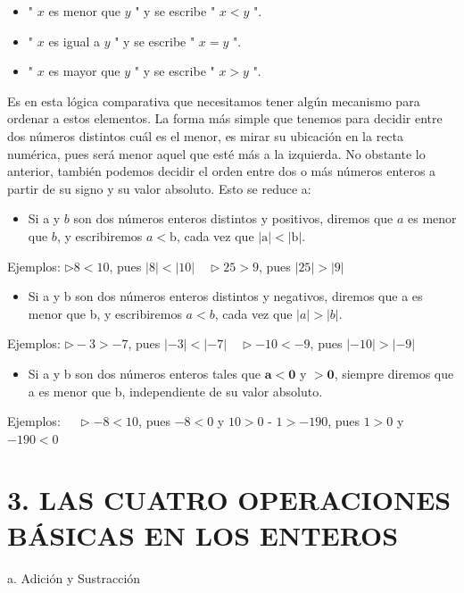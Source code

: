 \documentclass[10pt]{article}
\begin{document}
\begin{itemize}
  \item " $x$ es menor que $y$ " y se escribe " $x<y$ ".
  \item " $x$ es igual a $y$ " y se escribe " $x=y$ ".
  \item " $x$ es mayor que $y$ " y se escribe " $x>y$ ".
\end{itemize}

Es en esta lógica comparativa que necesitamos tener algún mecanismo para ordenar a estos elementos. La forma más simple que tenemos para decidir entre dos números distintos cuál es el menor, es mirar su ubicación en la recta numérica, pues será menor aquel que esté más a la izquierda. No obstante lo anterior, también podemos decidir el orden entre dos o más números enteros a partir de su signo y su valor absoluto. Esto se reduce a:

\begin{itemize}
  \item Si a y $b$ son dos números enteros distintos y positivos, diremos que $a$ es menor que $b$, y escribiremos $a <\mathrm{b}$, cada vez que $|\mathrm{a}|<|\mathrm{b}|$.
\end{itemize}

Ejemplos: $\triangleright 8<10$, pues $|8|<|10| \quad \triangleright 25>9$, pues $|25|>|9|$

\begin{itemize}
  \item Si a y b son dos números enteros distintos y negativos, diremos que a es menor que b, y escribiremos $a<b$, cada vez que $|a|>|b|$.
\end{itemize}

Ejemplos: $\triangleright-3>-7$, pues $|-3|<|-7| \quad \triangleright-10<-9$, pues $|-10|>|-9|$

\begin{itemize}
  \item Si a y b son dos números enteros tales que $\boldsymbol{a}<\boldsymbol{0}$ y $\boldsymbol{>} \mathbf{0}$, siempre diremos que a es menor que b, independiente de su valor absoluto.
\end{itemize}

Ejemplos: $\quad \triangleright-8<10$, pues $-8<0$ y $10>0$ - $1>-190$, pues $1>0$ y $-190<0$

\section*{3. LAS CUATRO OPERACIONES BÁSICAS EN LOS ENTEROS}
a. Adición y Sustracción
\end{document}
